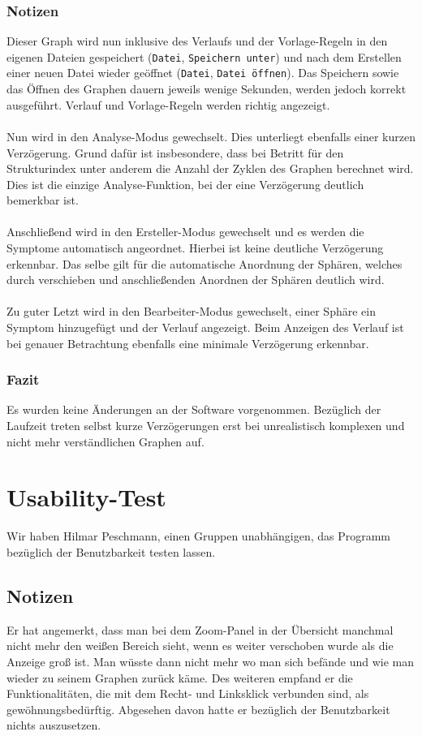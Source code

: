 \documentclass[enabledeprecatedfontcommands]{scrartcl}
\begin{document}
\subsubsection{Notizen}
Dieser Graph wird nun inklusive des Verlaufs und der Vorlage-Regeln in den eigenen Dateien gespeichert (\texttt{Datei}, \texttt{Speichern unter}) und nach dem Erstellen einer neuen Datei wieder geöffnet (\texttt{Datei}, \texttt{Datei öffnen}). Das Speichern sowie das Öffnen des Graphen dauern jeweils wenige Sekunden, werden jedoch korrekt ausgeführt. Verlauf und Vorlage-Regeln werden richtig angezeigt. \\ \\
Nun wird in den Analyse-Modus gewechselt. Dies unterliegt ebenfalls einer kurzen Verzögerung. Grund dafür ist insbesondere, dass bei Betritt für den Strukturindex unter anderem die Anzahl der Zyklen des Graphen berechnet wird. Dies ist die einzige Analyse-Funktion, bei der eine Verzögerung deutlich bemerkbar ist. \\ \\
Anschließend wird in den Ersteller-Modus gewechselt und es werden die Symptome automatisch angeordnet. Hierbei ist keine deutliche Verzögerung erkennbar. Das selbe gilt für die automatische Anordnung der Sphären, welches durch verschieben und anschließenden Anordnen der Sphären deutlich wird. \\ \\
Zu guter Letzt wird in den Bearbeiter-Modus gewechselt, einer Sphäre ein Symptom hinzugefügt und der Verlauf angezeigt. Beim Anzeigen des Verlauf ist bei genauer Betrachtung ebenfalls eine minimale Verzögerung erkennbar. 
\subsubsection{Fazit}
Es wurden keine Änderungen an der Software vorgenommen. Bezüglich der Laufzeit treten selbst kurze Verzögerungen erst bei unrealistisch komplexen und nicht mehr verständlichen Graphen auf.  

\newpage
\section{Usability-Test}
Wir haben Hilmar Peschmann, einen Gruppen unabhängigen, das Programm bezüglich der Benutzbarkeit testen lassen. 
\subsection{Notizen}
Er hat angemerkt, dass man bei dem Zoom-Panel in der Übersicht manchmal nicht mehr den weißen Bereich sieht, wenn es weiter verschoben wurde als die Anzeige groß ist. Man wüsste dann nicht mehr wo man sich befände und wie man wieder zu seinem Graphen zurück käme. Des weiteren empfand er die Funktionalitäten, die mit dem Recht- und Linksklick verbunden sind, als gewöhnungsbedürftig. Abgesehen davon hatte er bezüglich der Benutzbarkeit nichts auszusetzen. 
\end{document}
